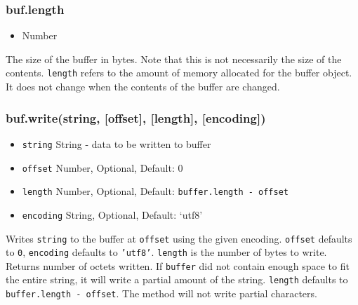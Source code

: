 \subsubsection{buf.length}\label{buf.length}

\begin{itemize}
\itemsep1pt\parskip0pt
\item
  Number
\end{itemize}

The size of the buffer in bytes. Note that this is not necessarily the
size of the contents. \texttt{length} refers to the amount of memory
allocated for the buffer object. It does not change when the contents of
the buffer are changed.

\begin{Shaded}
\begin{Highlighting}[]
 \NormalTok{(}\NormalTok{);}

\NormalTok{(}\NormalTok{);}
\NormalTok{(}\NormalTok{, }\NormalTok{, }\NormalTok{);}
\NormalTok{(}\NormalTok{);}

\end{Highlighting}
\end{Shaded}

\subsubsection{buf.write(string, {[}offset{]}, {[}length{]},
{[}encoding{]})}\label{buf.writestring-offset-length-encoding}

\begin{itemize}
\itemsep1pt\parskip0pt
\item
  \texttt{string} String - data to be written to buffer
\item
  \texttt{offset} Number, Optional, Default: 0
\item
  \texttt{length} Number, Optional, Default:
  \texttt{buffer.length - offset}
\item
  \texttt{encoding} String, Optional, Default: `utf8'
\end{itemize}

Writes \texttt{string} to the buffer at \texttt{offset} using the given
encoding. \texttt{offset} defaults to \texttt{0}, \texttt{encoding}
defaults to \texttt{'utf8'}. \texttt{length} is the number of bytes to
write. Returns number of octets written. If \texttt{buffer} did not
contain enough space to fit the entire string, it will write a partial
amount of the string. \texttt{length} defaults to
\texttt{buffer.length - offset}. The method will not write partial
characters.

